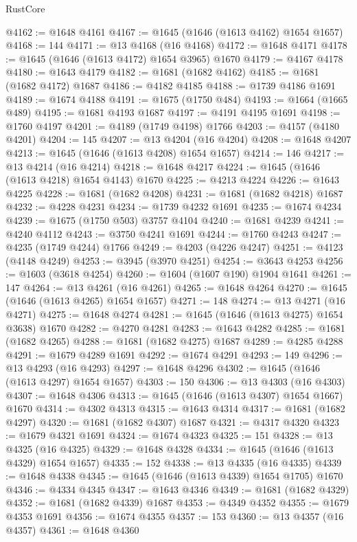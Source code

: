 \begin{lexlean}{RustCore}
\begin{coremodule}
@4162 := @1648 @4161
@4167 := @1645 (@1646 (@1613 @4162) @1654 @1657)
@4168 := 144
@4171 := @13 @4168 (@16 @4168)
@4172 := @1648 @4171
@4178 := @1645 (@1646 (@1613 @4172) @1654 @3965) @1670
@4179 := @4167 @4178
@4180 := @1643 @4179
@4182 := @1681 (@1682 @4162)
@4185 := @1681 (@1682 @4172) @1687
@4186 := @4182 @4185
@4188 := @1739 @4186 @1691
@4189 := @1674 @4188
@4191 := @1675 (@1750 @484)
@4193 := @1664 (@1665 @489)
@4195 := @1681 @4193 @1687
@4197 := @4191 @4195 @1691
@4198 := @1760 @4197
@4201 := @4189 (@1749 @4198) @1766
@4203 := @4157 (@4180 @4201)
@4204 := 145
@4207 := @13 @4204 (@16 @4204)
@4208 := @1648 @4207
@4213 := @1645 (@1646 (@1613 @4208) @1654 @1657)
@4214 := 146
@4217 := @13 @4214 (@16 @4214)
@4218 := @1648 @4217
@4224 := @1645 (@1646 (@1613 @4218) @1654 @4143) @1670
@4225 := @4213 @4224
@4226 := @1643 @4225
@4228 := @1681 (@1682 @4208)
@4231 := @1681 (@1682 @4218) @1687
@4232 := @4228 @4231
@4234 := @1739 @4232 @1691
@4235 := @1674 @4234
@4239 := @1675 (@1750 @503) @3757 @4104
@4240 := @1681 @4239
@4241 := @4240 @4112
@4243 := @3750 @4241 @1691
@4244 := @1760 @4243
@4247 := @4235 (@1749 @4244) @1766
@4249 := @4203 (@4226 @4247)
@4251 := @4123 (@4148 @4249)
@4253 := @3945 (@3970 @4251)
@4254 := @3643 @4253
@4256 := @1603 (@3618 @4254)
@4260 := @1604 (@1607 @190) @1904 @1641
@4261 := 147
@4264 := @13 @4261 (@16 @4261)
@4265 := @1648 @4264
@4270 := @1645 (@1646 (@1613 @4265) @1654 @1657)
@4271 := 148
@4274 := @13 @4271 (@16 @4271)
@4275 := @1648 @4274
@4281 := @1645 (@1646 (@1613 @4275) @1654 @3638) @1670
@4282 := @4270 @4281
@4283 := @1643 @4282
@4285 := @1681 (@1682 @4265)
@4288 := @1681 (@1682 @4275) @1687
@4289 := @4285 @4288
@4291 := @1679 @4289 @1691
@4292 := @1674 @4291
@4293 := 149
@4296 := @13 @4293 (@16 @4293)
@4297 := @1648 @4296
@4302 := @1645 (@1646 (@1613 @4297) @1654 @1657)
@4303 := 150
@4306 := @13 @4303 (@16 @4303)
@4307 := @1648 @4306
@4313 := @1645 (@1646 (@1613 @4307) @1654 @1667) @1670
@4314 := @4302 @4313
@4315 := @1643 @4314
@4317 := @1681 (@1682 @4297)
@4320 := @1681 (@1682 @4307) @1687
@4321 := @4317 @4320
@4323 := @1679 @4321 @1691
@4324 := @1674 @4323
@4325 := 151
@4328 := @13 @4325 (@16 @4325)
@4329 := @1648 @4328
@4334 := @1645 (@1646 (@1613 @4329) @1654 @1657)
@4335 := 152
@4338 := @13 @4335 (@16 @4335)
@4339 := @1648 @4338
@4345 := @1645 (@1646 (@1613 @4339) @1654 @1705) @1670
@4346 := @4334 @4345
@4347 := @1643 @4346
@4349 := @1681 (@1682 @4329)
@4352 := @1681 (@1682 @4339) @1687
@4353 := @4349 @4352
@4355 := @1679 @4353 @1691
@4356 := @1674 @4355
@4357 := 153
@4360 := @13 @4357 (@16 @4357)
@4361 := @1648 @4360

\end{coremodule}
\end{lexlean}
